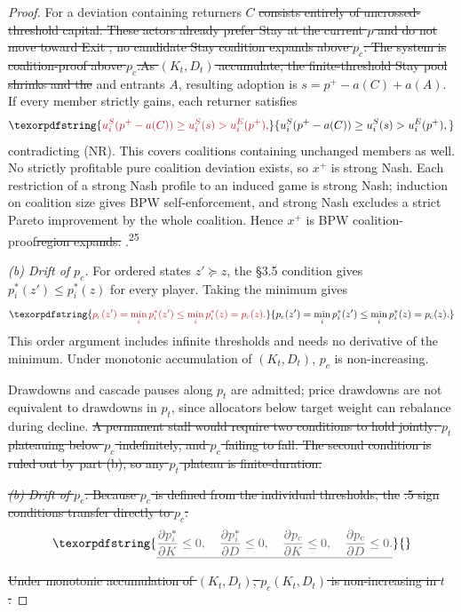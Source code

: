 \documentclass[12pt]{article}
\theoremstyle{definition}
\theoremstyle{remark}
\providecommand{\DIFaddtex}[1]{{\color{AddedText}#1}}
\providecommand{\DIFdeltex}[1]{{\color{DeletedText}\sout{#1}}}
\providecommand{\DIFaddbegin}{}
\providecommand{\DIFaddend}{}
\providecommand{\DIFdelbegin}{}
\providecommand{\DIFdelend}{}
\providecommand{\DIFadd}[1]{\texorpdfstring{\DIFaddtex{#1}}{#1}} %
\providecommand{\DIFdel}[1]{\texorpdfstring{\DIFdeltex{#1}}{}} %
\begin{document}
\begin{proof}
\DIFadd{For a deviation containing returners }\DIFaddend $C$ \DIFdelbegin \DIFdel{consists entirely of uncrossed-threshold capital. These actors already prefer Stay at the current $p$ and do not move toward Exit ; no candidate Stay coalition expands above $p_c$.
The system is coalition-proof above $p_c$.As $(K_t, D_t)$ accumulate, the finite-threshold Stay pool shrinks and the }\DIFdelend \DIFaddbegin \DIFadd{and entrants $A$, resulting adoption is $s=p^+-a(C)+a(A)$. If every member strictly gains, each returner satisfies
}\[
 \DIFadd{u_i^S(p^+-a(C))\ge u_i^S(s)>u_i^E(p^+),
}\]
\DIFadd{contradicting (NR). This covers coalitions containing unchanged members as well. No strictly profitable pure coalition deviation exists, so $x^+$ is strong Nash. Each restriction of a strong Nash profile to an induced game is strong Nash; induction on coalition size gives BPW self-enforcement, and strong Nash excludes a strict Pareto improvement by the whole coalition. Hence $x^+$ is BPW }\DIFaddend coalition-proof\DIFdelbegin \DIFdel{region expands. }\DIFdelend \DIFaddbegin \DIFadd{.\textsuperscript{25}
}

\DIFadd{\emph{(b) Drift of $p_c$.} For ordered states $z'\succeq z$, the }\S3\DIFadd{.5 condition gives $p_i^*(z')\le p_i^*(z)$ for every player. Taking the minimum gives
}\[
 \DIFadd{p_c(z')=\min_i p_i^*(z')\le\min_i p_i^*(z)=p_c(z).
}\]
\DIFadd{This order argument includes infinite thresholds and needs no derivative of the minimum. Under monotonic accumulation of $(K_t,D_t)$, $p_c$ is non-increasing.
}

\DIFaddend Drawdowns and cascade pauses along $p_t$ are admitted; price drawdowns are not equivalent to drawdowns in $p_t$, since allocators below target weight can rebalance during decline.
\DIFdelbegin \DIFdel{A permanent stall would require two conditions to hold jointly: $p_t$ plateauing below $p_c$ indefinitely, and $p_c$ failing to fall. The second condition is ruled out by part (b), so any $p_t$ plateau is finite-duration.
}%

\DIFdel{\emph{(b) Drift of $p_c$.} Because $p_c$ is defined from the individual thresholds, the }%
\DIFdel{.5 sign conditions transfer directly to $p_c$:
}\[
\DIFdel{\frac{\partial p_i^*}{\partial K} \leq 0, \quad \frac{\partial p_i^*}{\partial D} \leq 0, \quad \frac{\partial p_c}{\partial K} \leq 0, \quad \frac{\partial p_c}{\partial D} \leq 0.
}\]%
\DIFdel{Under monotonic accumulation of $(K_t, D_t)$, $p_c(K_t, D_t)$ is non-increasing in $t$.
}\DIFdelend \end{proof}
\end{document}
